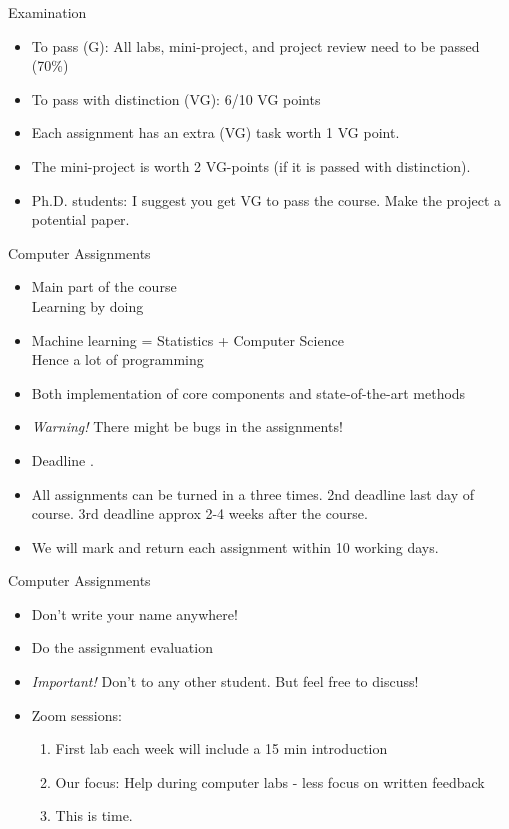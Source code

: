\documentclass[10pt,handout]{beamer}
\begin{document}
\begin{frame}{Examination}

\begin{itemize}
\item To pass (G): All labs, mini-project, and project review need to be passed (70\%)\pause
\item To pass with distinction (VG): 6/10 VG points\pause
\item Each assignment has an extra (VG) task worth 1 VG point.\pause
\item The mini-project is worth 2 VG-points (if it is passed with distinction).
\item Ph.D. students: I suggest you get VG to pass the course. Make the project a potential paper.
\end{itemize}

\end{frame}


\begin{frame}{Computer Assignments}

\begin{itemize}
\item Main part of the course\\Learning by doing
\item Machine learning = Statistics + Computer Science\\Hence a lot of programming\pause
\item Both implementation of core components and state-of-the-art methods\pause
\item \emph{Warning!} There might be bugs in the assignments! \pause
\item Deadline .\pause
\item All assignments can be turned in a three times. 2nd deadline last day of course. 3rd deadline approx 2-4 weeks after the course. \pause
\item We will mark and return each assignment within 10 working days.
\end{itemize}
\end{frame}

\begin{frame}{Computer Assignments}

\begin{itemize}
\item Don't write your name anywhere!\pause
\item Do the assignment evaluation\pause
\item \emph{Important!} Don't  to any other student. But feel free to discuss!\pause
\item Zoom sessions:
\begin{enumerate}
  \item First lab each week will include a 15 min introduction
  \item Our focus: Help during computer labs - less focus on written feedback
  \item {} This is  time.\pause
\end{enumerate}
\end{itemize}
\end{frame}
\end{document}
